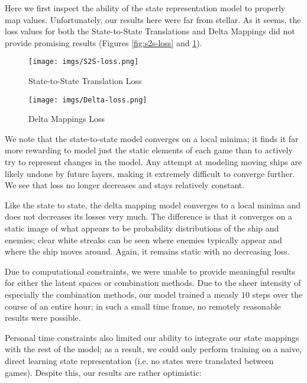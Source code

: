 \documentclass{article} %
\begin{document}
Here we first inspect the ability of the state representation model to properly map values.
Unfortunately, our results here were far from stellar. As it seems, the loss values for both the
State-to-State Translations and Delta Mappings did not provide promising results (Figures
\ref{fig:s2s-loss} and \ref{fig:delta-loss}). 

\begin{figure}
    \centering
    \begin{minipage}{0.45\textwidth}
        \centering
        \texttt{[image: imgs/S2S-loss.png]} %
        \caption{State-to-State Translation Loss}
        \label{fig:s2s-loss}
    \end{minipage}\hfill
    \begin{minipage}{0.45\textwidth}
        \centering
        \texttt{[image: imgs/Delta-loss.png]} %
        \caption{Delta Mappings Loss}
        \label{fig:delta-loss}
    \end{minipage}
\end{figure}

We note that the state-to-state model converges on a local minima; it finds it far more rewarding
to model just the static elements of each game than to actively try to represent changes in the
model. Any attempt at modeling moving ships are likely undone by future layers, making it extremely
difficult to converge further. We see that loss no longer decreases and stays relatively constant.

Like the state to state, the delta mapping model converges to a local minima and does not decreases
its losses very much. The difference is that it converges on a static image of what appears to be
probability distributions of the ship and enemies; clear white streaks can be seen where enemies
typically appear and where the ship moves around. Again, it remains static with no decreasing loss.

Due to computational constraints, we were unable to provide meaningful results for either the latent
spaces or combination methods. Due to the sheer intensity of especially the combination methods, our
model trained a measly $10$ steps over the course of an entire hour; in such a small time frame, no
remotely reasonable results were possible.

Personal time constraints also limited our ability to integrate our state mappings with the rest of
the model; as a result, we could only perform training on a naive, direct learning state
representation (i.e. no states were translated between games). Despite this, our results are rather
optimistic:
\end{document}
